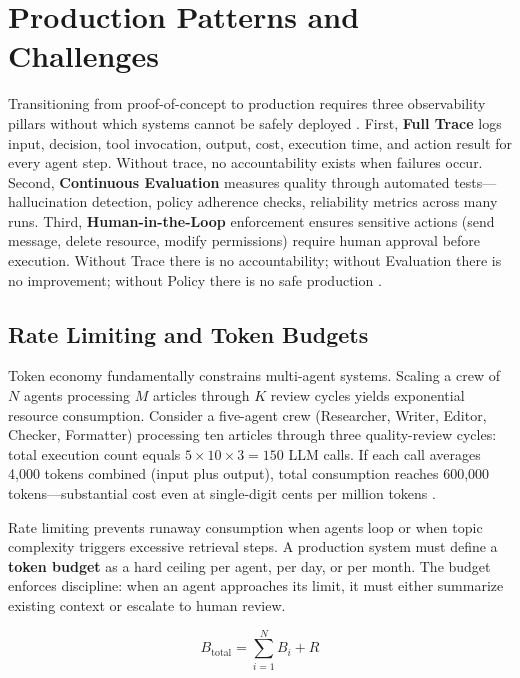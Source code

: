 \chapter{Production Patterns and Challenges}\label{ch:production}

Transitioning from proof-of-concept to production requires three observability pillars without which systems cannot be safely deployed \cite{Segal2026}. First, \textbf{Full Trace} logs input, decision, tool invocation, output, cost, execution time, and action result for every agent step. Without trace, no accountability exists when failures occur. Second, \textbf{Continuous Evaluation} measures quality through automated tests—hallucination detection, policy adherence checks, reliability metrics across many runs. Third, \textbf{Human-in-the-Loop} enforcement ensures sensitive actions (send message, delete resource, modify permissions) require human approval before execution. Without Trace there is no accountability; without Evaluation there is no improvement; without Policy there is no safe production \cite{Segal2026}.

\section{Rate Limiting and Token Budgets}

Token economy fundamentally constrains multi-agent systems. Scaling a crew of $N$ agents processing $M$ articles through $K$ review cycles yields exponential resource consumption. Consider a five-agent crew (Researcher, Writer, Editor, Checker, Formatter) processing ten articles through three quality-review cycles: total execution count equals $5 \times 10 \times 3 = 150$ LLM calls. If each call averages 4{,}000 tokens combined (input plus output), total consumption reaches 600{,}000 tokens—substantial cost even at single-digit cents per million tokens \cite{Segal2026}.

Rate limiting prevents runaway consumption when agents loop or when topic complexity triggers excessive retrieval steps. A production system must define a \textbf{token budget} as a hard ceiling per agent, per day, or per month. The budget enforces discipline: when an agent approaches its limit, it must either summarize existing context or escalate to human review.

\begin{equation}
B_{\text{total}} = \sum_{i=1}^{N} B_{i} + R
\label{eq:token_budget}
\end{equation}

